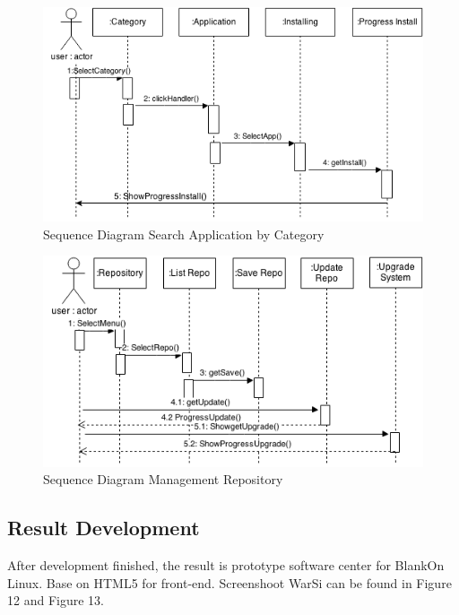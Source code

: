 \documentclass[conference, letterpaper]{IEEEtran}
\begin{document}
\begin{figure}[!t]
\centering
\includegraphics[scale=0.4]{image/SearchbyCategory.png}
\caption{Sequence Diagram Search Application by Category}
\end{figure}

\begin{figure}[!t]
\centering
\includegraphics[scale=0.4]{image/ManagementRepo.png}
\caption{Sequence Diagram Management Repository}
\end{figure}

\subsection{Result Development}
After development finished, the result is prototype software center for BlankOn Linux. Base on HTML5 for front-end. Screenshoot WarSi can be found in Figure 12 and Figure 13.
\end{document}
